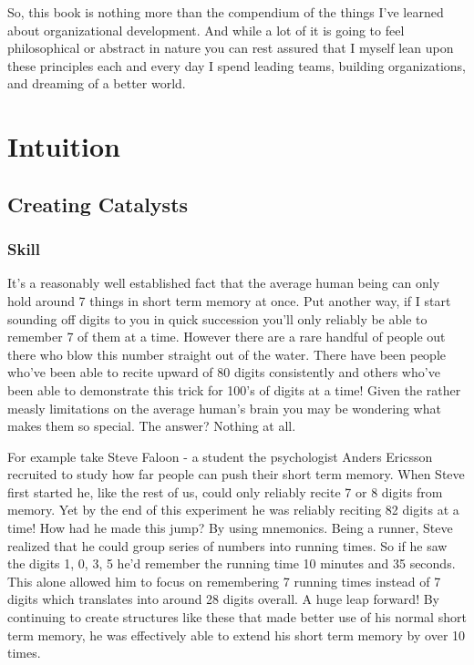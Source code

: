 \documentclass[11pt]{book}
\begin{document}
So, this book is nothing more than the compendium of the things I've learned about organizational development. And while a lot of it is going to feel philosophical or abstract in nature you can rest assured that I myself lean upon these principles each and every day I spend leading teams, building organizations, and dreaming of a better world. 


\part{Intuition}
\chapter{Creating Catalysts}
\section{Skill}
It's a reasonably well established fact that the average human being can only hold around 7 things in short term memory at once. Put another way, if I start sounding off digits to you in quick succession you'll only reliably be able to remember 7 of them at a time. However there are a rare handful of people out there who blow this number straight out of the water. There have been people who've been able to recite upward of 80 digits consistently and others who've been able to demonstrate this trick for 100's of digits at a time! Given the rather measly limitations on the average human's brain you may be wondering what makes them so special. The answer? Nothing at all.
\newline

For example take Steve Faloon - a student the psychologist Anders Ericsson recruited to study how far people can push their short term memory. When Steve first started he, like the rest of us, could only reliably recite 7 or 8 digits from memory. Yet by the end of this experiment he was reliably reciting 82 digits at a time! How had he made this jump? By using mnemonics. Being a runner, Steve realized that he could group series of numbers into running times. So if he saw the digits 1, 0, 3, 5 he'd remember the running time 10 minutes and 35 seconds. This alone allowed him to focus on remembering 7 running times instead of 7 digits which translates into around 28 digits overall. A huge leap forward! By continuing to create structures like these that made better use of his normal short term memory, he was effectively able to extend his short term memory by over 10 times. 
\newline
\end{document}
